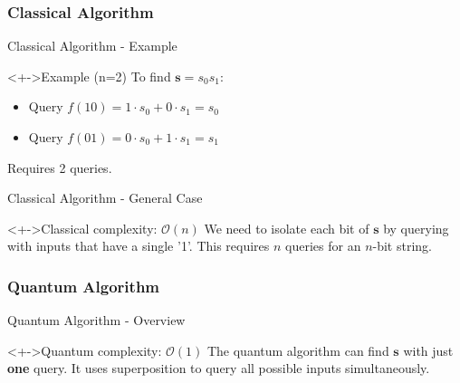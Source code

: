 \documentclass{beamer}
\begin{document}
\subsubsection*{Classical Algorithm}
\begin{frame}{Classical Algorithm - Example}
\begin{linenumbers}
  \begin{block}<+->{Example (n=2)}
    To find $\mathbf{s} = s_0s_1$:
    \begin{itemize}[<+->]
        \item Query $f(10) = 1 \cdot s_0 + 0 \cdot s_1 = s_0$
        \item Query $f(01) = 0 \cdot s_0 + 1 \cdot s_1 = s_1$
    \end{itemize}
    Requires 2 queries.
  \end{block}
\end{linenumbers}
\end{frame}

\begin{frame}{Classical Algorithm - General Case}
	\begin{linenumbers}
		\begin{block}<+->{Classical complexity: $\mathcal{O}(n)$}
			We need to isolate each bit of $\mathbf{s}$ by querying with inputs that have a single '1'. This requires $n$ queries for an $n$-bit string.
		\end{block}
	\end{linenumbers}
	\end{frame}
	

\subsubsection*{Quantum Algorithm}
\begin{frame}{Quantum Algorithm - Overview}
\begin{linenumbers}
	\begin{block}<+->{Quantum complexity: $\mathcal{O}(1)$}
		The quantum algorithm can find $\mathbf{s}$ with just \textbf{one} query.  It uses superposition to query all possible inputs simultaneously.
	\end{block}
\end{linenumbers}
\end{frame}
\end{document}
